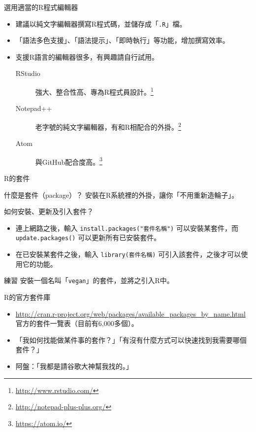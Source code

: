 \documentclass[12pt]{beamer}
\let\oldfootnote\footnote
\renewcommand\footnote[1]{\oldfootnote{\scriptsize\ignorespaces#1}}
\begin{document}
\begin{frame}[fragile]{選用適當的R程式編輯器}
\begin{itemize}
\item 建議以純文字編輯器撰寫R程式碼，並儲存成「\verb+.R+」檔。
\item 「語法多色支援」、「語法提示」、「即時執行」等功能，增加撰寫效率。
\item 支援R語言的編輯器很多，有興趣請自行試用。
\begin{description}
	\item [RStudio] 強大、整合性高、專為R程式員設計。\footnote{\url{http://www.rstudio.com/}}
	\item [Notepad++] 老字號的純文字編輯器，有和R相配合的外掛。\footnote{\url{http://notepad-plus-plus.org/}}
	\item [Atom] 與GitHub配合度高。\footnote{\url{https://atom.io/}}
\end{description}
\end{itemize}
\end{frame}


\begin{frame}[fragile]{R的套件}
\begin{block}{什麼是套件（package）？}
安裝在R系統裡的外掛，讓你「不用重新造輪子」。
\end{block}

\begin{block}{如何安裝、更新及引入套件？}
\begin{itemize}
\item 連上網路之後，輸入
\verb+install.packages("套件名稱")+
可以安裝某套件，而
\verb+update.packages()+
可以更新所有已安裝套件。

\item 在已安裝某套件之後，輸入
\verb+library(套件名稱)+
可引入該套件，之後才可以使用它的功能。
\end{itemize}
\end{block}

\begin{block}{練習}
安裝一個名叫「\verb+vegan+」的套件，並將之引入R中。
\end{block}
\end{frame}

\begin{frame}[fragile]{R的官方套件庫}
\begin{itemize}
\item \url{http://cran.r-project.org/web/packages/available_packages_by_name.html}\\
官方的套件一覽表（目前有6,000多個）。
\item 「我如何找能做某件事的套作？」「有沒有什麼方式可以快速找到我需要哪個套件？」
\item 阿盤：「我都是請谷歌大神幫我找的。」
\end{itemize}
\end{frame}
\end{document}
